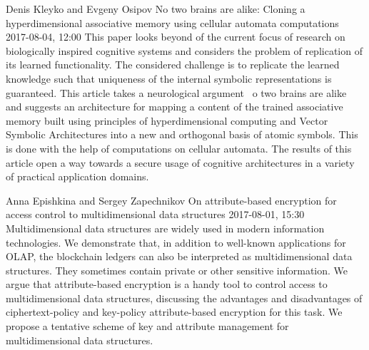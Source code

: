 \documentclass[10pt,fleqn,openany]{book} %
\begin{document}
\begin{enumerate}
		
		\paperabstract
		{Denis Kleyko and Evgeny Osipov}
		{No two brains are alike: Cloning a hyperdimensional associative memory using cellular automata computations}
		{2017-08-04, 12:00}
		{This paper looks beyond of the current focus of research on biologically inspired cognitive systems and considers the problem of replication of its learned functionality. The considered challenge is to replicate the learned knowledge such that uniqueness of the internal symbolic representations is guaranteed. This article takes a neurological argument \ o two brains are alike and suggests an architecture for mapping a content of the trained associative memory built using principles of hyperdimensional computing and Vector Symbolic Architectures into a new and orthogonal basis of atomic symbols. This is done with the help of computations on cellular automata. The results of this article open a way towards a secure usage of cognitive architectures in a variety of practical application domains.}
		
		
		\paperabstract
		{Anna Epishkina and Sergey Zapechnikov}
		{On attribute-based encryption for access control to multidimensional data structures}
		{2017-08-01, 15:30}
		{Multidimensional data structures are widely used in modern information technologies. We demonstrate that, in addition to well-known applications for OLAP, the blockchain ledgers can also be interpreted as multidimensional data structures. They sometimes contain private or other sensitive information. We argue that attribute-based encryption is a handy tool to control access to multidimensional data structures, discussing the advantages and disadvantages of ciphertext-policy and key-policy attribute-based encryption for this task. We propose a tentative scheme of key and attribute management for multidimensional data structures.}
		

\end{enumerate}
\end{document}

